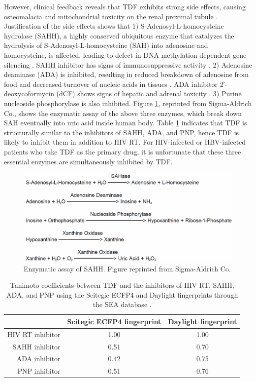 \documentclass[10pt, conference, compsocconf]{IEEEtran}
\begin{document}
However, clinical feedback reveals that TDF exhibits strong side effects, causing osteomalacia and mitochondrial toxicity on the renal proximal tubule \cite{185}. Justification of the side effects shows that 1) S-Adenosyl-L-homocysteine hydrolase (SAHH), a highly conserved ubiquitous enzyme that catalyzes the hydrolysis of S-Adenosyl-L-homocysteine (SAH) into adenosine and homocysteine, is affected, leading to defect in DNA methylation-dependent gene silencing \cite{182}. SAHH inhibitor has signs of immunosuppressive activity \cite{183}. 2) Adenosine deaminase (ADA) is inhibited, resulting in reduced breakdown of adenosine from food and decreased turnover of nucleic acids in tissues \cite{999}. ADA inhibitor 2′-deoxycoformycin (dCF) shows signs of hepatic and adrenal toxicity \cite{187}. 3) Purine nucleoside phosphorylase is also inhibited. Figure \ref{fig:EnzymaticAssay}, reprinted from Sigma-Aldrich Co., shows the enzymatic assay of the above three enzymes, which break down SAH eventually into uric acid inside human body. Table \ref{tab:TanimotoCoefficients} indicates that TDF is structurally similar to the inhibitors of SAHH, ADA, and PNP, hence TDF is likely to inhibit them in addition to HIV RT. For HIV-infected or HBV-infected patients who take TDF as the primary drug, it is unfortunate that these three essential enzymes are simultaneously inhibited by TDF.

\begin{figure}
\centering
\includegraphics[width=\linewidth]{Figures/EnzymaticAssay.png}
\caption{Enzymatic assay of SAHH. Figure reprinted from Sigma-Aldrich Co.}
\label{fig:EnzymaticAssay}
\end{figure}

\begin{table}
\centering
\begin{tabular}
{rcc}
\toprule
& Scitegic ECFP4 fingerprint & Daylight fingerprint\\
\midrule
HIV RT inhibitor & 1.00 & 1.00 \\
  SAHH inhibitor & 0.51 & 0.70 \\
   ADA inhibitor & 0.42 & 0.75 \\
   PNP inhibitor & 0.51 & 0.76 \\
\bottomrule
\end{tabular}
\caption{Tanimoto coefficients between TDF and the inhibitors of HIV RT, SAHH, ADA, and PNP using the Scitegic ECFP4 and Daylight fingerprints through the SEA database \cite{380}.}
\label{tab:TanimotoCoefficients}
\end{table}
\end{document}
